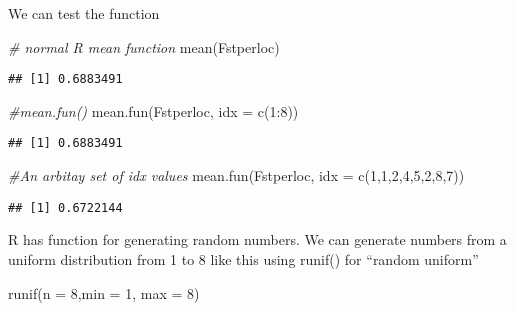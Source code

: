 \documentclass[
]{book}
\newenvironment{Shaded}{\begin{snugshade}}{\end{snugshade}}
\newcommand{\AttributeTok}[1]{\textcolor[rgb]{0.77,0.63,0.00}{#1}}
\newcommand{\CommentTok}[1]{\textcolor[rgb]{0.56,0.35,0.01}{\textit{#1}}}
\newcommand{\DecValTok}[1]{\textcolor[rgb]{0.00,0.00,0.81}{#1}}
\newcommand{\FunctionTok}[1]{\textcolor[rgb]{0.00,0.00,0.00}{#1}}
\newcommand{\NormalTok}[1]{#1}
\newcommand{\SpecialCharTok}[1]{\textcolor[rgb]{0.00,0.00,0.00}{#1}}
\begin{document}
We can test the function

\begin{Shaded}
\begin{Highlighting}[]
\CommentTok{\# normal R mean function}
\FunctionTok{mean}\NormalTok{(Fstperloc)}
\end{Highlighting}
\end{Shaded}

\begin{verbatim}
## [1] 0.6883491
\end{verbatim}

\begin{Shaded}
\begin{Highlighting}[]
\CommentTok{\#mean.fun()}
\FunctionTok{mean.fun}\NormalTok{(Fstperloc, }\AttributeTok{idx =} \FunctionTok{c}\NormalTok{(}\DecValTok{1}\SpecialCharTok{:}\DecValTok{8}\NormalTok{))}
\end{Highlighting}
\end{Shaded}

\begin{verbatim}
## [1] 0.6883491
\end{verbatim}

\begin{Shaded}
\begin{Highlighting}[]
\CommentTok{\#An arbitay set of idx values}
\FunctionTok{mean.fun}\NormalTok{(Fstperloc, }\AttributeTok{idx =} \FunctionTok{c}\NormalTok{(}\DecValTok{1}\NormalTok{,}\DecValTok{1}\NormalTok{,}\DecValTok{2}\NormalTok{,}\DecValTok{4}\NormalTok{,}\DecValTok{5}\NormalTok{,}\DecValTok{2}\NormalTok{,}\DecValTok{8}\NormalTok{,}\DecValTok{7}\NormalTok{))}
\end{Highlighting}
\end{Shaded}

\begin{verbatim}
## [1] 0.6722144
\end{verbatim}

R has function for generating random numbers. We can generate numbers from a uniform distribution from 1 to 8 like this using runif() for ``random uniform''

\begin{Shaded}
\begin{Highlighting}[]
\FunctionTok{runif}\NormalTok{(}\AttributeTok{n =} \DecValTok{8}\NormalTok{,}\AttributeTok{min =} \DecValTok{1}\NormalTok{, }\AttributeTok{max =} \DecValTok{8}\NormalTok{)}
\end{Highlighting}
\end{Shaded}
\end{document}
